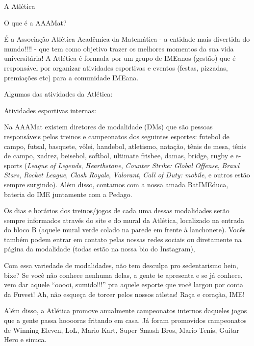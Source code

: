 \begin{secao}{A Atlética} %

\begin{subsecao}{O que é a AAAMat?}

É a Associação Atlética Acadêmica da Matemática - a entidade mais divertida do
mundo!!!! - que tem como objetivo trazer os melhores momentos da sua vida
universitária! A Atlética é formada por um grupo de IMEanos (gestão) que é
responsável por organizar atividades esportivas e eventos (festas, pizzadas,
premiações etc) para a comunidade IMEana.

\end{subsecao}

Algumas das atividades da Atlética:

\begin{subsecao}{Atividades esportivas internas:}

Na AAAMat existem diretores de modalidade (DMs) que são pessoas responsáveis
pelos treinos e campeonatos dos seguintes esportes: futebol de campo, futsal,
basquete, vôlei, handebol, atletismo, natação, tênis de mesa, tênis de campo,
xadrez, beisebol, softbol, ultimate frisbee, damas, bridge,
rugby e e-sports (\textit{League of Legends}, \textit{Hearthstone},
\textit{Counter Strike: Global Offense}, \textit{Brawl Stars},
\textit{Rocket League}, \textit{Clash Royale}, \textit{Valorant},
\textit{Call of Duty: mobile}, e outros estão sempre surgindo). Além disso,
contamos com a nossa amada BatIMEduca, bateria do IME juntamente com a Pedago.

Os dias e horários dos treinos/jogos de cada uma dessas modalidades serão
sempre informados através do site e do mural da Atlética, localizado na entrada
do bloco B (aquele mural verde colado na parede em frente à lanchonete).
Vocês também podem entrar em contato pelas nossas redes sociais ou diretamente
na página da modalidade (todas estão na nossa bio do Instagram),

Com essa variedade de modalidades, não tem desculpa pro sedentarismo hein,
bixe? Se você não conhece nenhuma delas, a gente te apresenta e se já conhece,
vem dar aquele “ooooi, sumido!!!” pra aquele esporte que você largou por conta
da Fuvest! Ah, não esqueça de torcer pelos nossos atletas! Raça e coração, IME!

Além disso, a Atlética promove anualmente campeonatos internos daqueles jogos
que a gente passa hooooras fritando em casa. Já foram promovidos campeonatos de
Winning Eleven, LoL, Mario Kart, Super Smash Bros, Mario Tenis, Guitar Hero e
sinuca.


\end{subsecao}
\end{secao}
